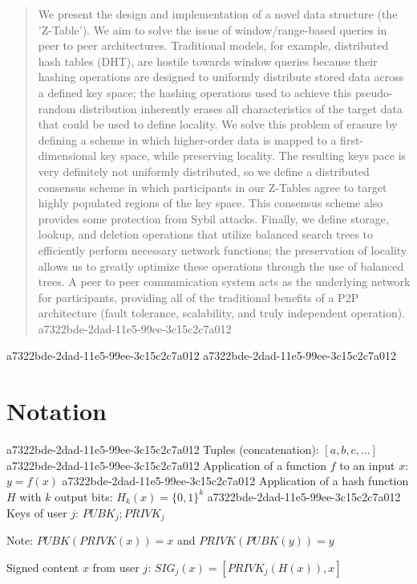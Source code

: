 \documentclass[12pt]{article}
\begin{document}
\maketitle

\begin{abstract}
We present the design and implementation of a novel data structure (the 'Z-Table'). We aim to solve the issue of window/range-based queries in peer to peer architectures. Traditional models, for example,  distributed hash tables (DHT), are hostile towards window queries because their hashing operations are designed to uniformly distribute stored data across a defined key space; the hashing operations used to achieve this pseudo-random distribution inherently erases all characteristics of the target data that could be used to define locality. We solve this problem of erasure by defining a scheme in which higher-order data is mapped to a first-dimensional key space, while preserving locality. The resulting keys pace is very definitely not uniformly distributed, so we define a distributed consensus scheme in which participants in our Z-Tables agree to target highly populated regions of the key space. This consensus scheme also provides some protection from Sybil attacks. Finally, we define storage, lookup, and deletion operations that utilize balanced search trees to efficiently perform necessary network functions; the preservation of locality allows us to greatly optimize these operations through the use of balanced trees. A peer to peer communication system acts as the underlying network for participants, providing all of the traditional benefits of a P2P architecture (fault tolerance, scalability, and truly independent operation).
a7322bde-2dad-11e5-99ee-3c15c2c7a012\end{abstract}
a7322bde-2dad-11e5-99ee-3c15c2c7a012
a7322bde-2dad-11e5-99ee-3c15c2c7a012\section{Notation}
a7322bde-2dad-11e5-99ee-3c15c2c7a012
Tuples (concatenation): $[a,b,c,...]$
a7322bde-2dad-11e5-99ee-3c15c2c7a012
Application of a function $f$ to an input $x$: $y=f(x)$
a7322bde-2dad-11e5-99ee-3c15c2c7a012
Application of a hash function $H$ with $k$ output bits: $H_{k}(x) = \{0,1\}^k$
a7322bde-2dad-11e5-99ee-3c15c2c7a012
Keys of user $j$: $ PUBK_j; PRIVK_j $

Note: $PUBK(PRIVK(x)) = x$ and $PRIVK(PUBK(y)) = y$~

Signed content $x$ from user $j$: $SIG_j(x) = \left[ PRIVK_j( H(x) ), x \right]$
\end{document}
